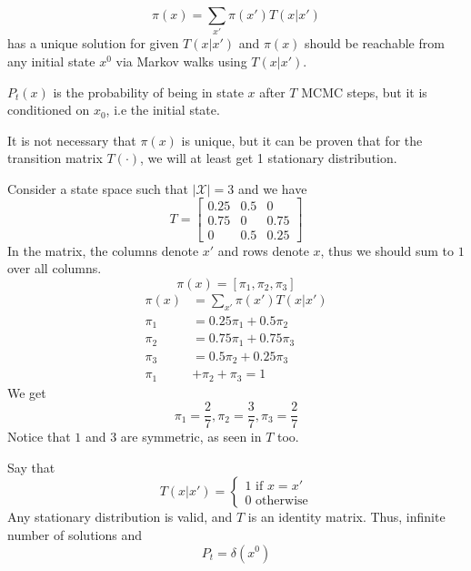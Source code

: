 \begin{equation}
	\pi(x) = \sum_{x'} \pi(x') T(x|x')
\end{equation}
has a unique solution for given $T(x|x')$ and $\pi(x)$ should be reachable from any initial state $x^0$ via Markov walks using $T(x|x')$. \\
\begin{rem}
$P_t(x)$ is the probability of being in state $x$ after $T$ MCMC steps, but it is conditioned on $x_0$, i.e the initial state.
\end{rem}
\begin{rem}
	It is not necessary that $\pi(x)$ is unique, but it can be proven that for the transition matrix $T(\cdot)$, we will at least get 1 stationary distribution.
\end{rem}
\begin{exmp}
Consider a state space such that $|\mathcal X| = 3$ and we have
\[T = \begin{bmatrix}
	0.25 & 0.5 & 0 \\
	0.75 & 0 & 0.75 \\
	0 & 0.5 & 0.25
\end{bmatrix}\]
In the matrix, the columns denote $x'$ and rows denote $x$, thus we should sum to $1$ over all columns. \\
\[\pi(x) = [\pi_1, \pi_2, \pi_3]\]
\begin{align*}
	\pi(x) &= \sum_{x'} \pi(x') T(x|x') \\
	\pi_1 &= 0.25\pi_1 + 0.5\pi_2 \\
	\pi_2 &= 0.75\pi_1 + 0.75\pi_3 \\
	\pi_3 &= 0.5\pi_2 + 0.25\pi_3 \\
	\pi_1 &+ \pi_2 + \pi_3 = 1
\end{align*}
We get
\[\pi_1 = \frac{2}{7}, \pi_2 = \frac{3}{7}, \pi_3 = \frac{2}{7}\]
Notice that $1$ and $3$ are symmetric, as seen in $T$ too.
\end{exmp}
\begin{exmp}
Say that
\[
T(x|x') = \begin{cases}
	1 \text{ if } x = x' \\
	0 \text{ otherwise}
\end{cases}
\]
Any stationary distribution is valid, and $T$ is an identity matrix. Thus, infinite number of solutions and 
\[P_t = \delta(x^0)\]
\end{exmp}
